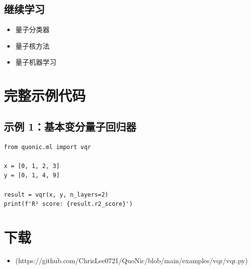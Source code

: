 \documentclass[12pt,a4paper]{article}
\begin{document}
\subsection{继续学习}
\begin{itemize}
  \item 量子分类器
  \item 量子核方法
  \item 量子机器学习
\end{itemize}

\section{完整示例代码}

\subsection{示例 1：基本变分量子回归器}

\begin{verbatim}
from quonic.ml import vqr

x = [0, 1, 2, 3]
y = [0, 1, 4, 9]

result = vqr(x, y, n_layers=2)
print(f'R² score: {result.r2_score}')
\end{verbatim}

\section{下载}

\begin{itemize}
  \item [vqr.py](https://github.com/ChrisLee0721/QuoNic/blob/main/examples/vqr/vqr.py)
\end{itemize}
\end{document}
